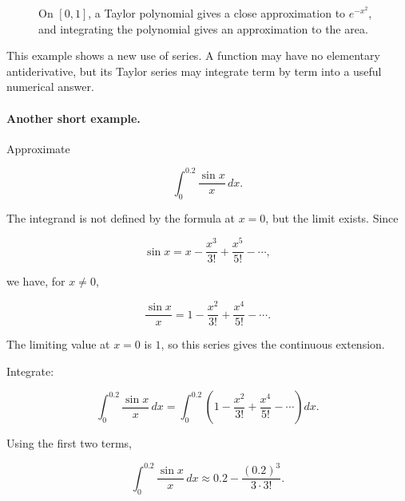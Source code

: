 \begin{figure}[h]
\centering
{}
\caption{On \([0,1]\), a Taylor polynomial gives a close approximation to \(e^{-x^2}\), and integrating the polynomial gives an approximation to the area.}
\label{fig:gaussian-taylor-approx}
\end{figure}

This example shows a new use of series.  A function may have no elementary
antiderivative, but its Taylor series may integrate term by term into a useful numerical
answer.

\paragraph{Another short example.}
Approximate

\[
\int_0^{0.2}\frac{\sin x}{x}\,dx.
\]

The integrand is not defined by the formula at \(x=0\), but the limit exists.  Since

\[
\sin x=x-\frac{x^3}{3!}+\frac{x^5}{5!}-\cdots,
\]

we have, for \(x\neq0\),

\[
\frac{\sin x}{x}
=
1-\frac{x^2}{3!}+\frac{x^4}{5!}-\cdots.
\]

The limiting value at \(x=0\) is \(1\), so this series gives the continuous extension.

Integrate:

\[
\int_0^{0.2}\frac{\sin x}{x}\,dx
=
\int_0^{0.2}
\left(
1-\frac{x^2}{3!}+\frac{x^4}{5!}-\cdots
\right)dx.
\]

Using the first two terms,

\[
\int_0^{0.2}\frac{\sin x}{x}\,dx
\approx
0.2-\frac{(0.2)^3}{3\cdot 3!}.
\]


